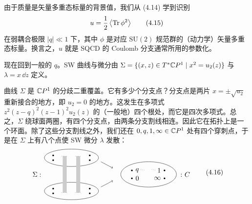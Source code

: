 
由于质量是矢量多重态标量的背景值，我们从 (4.14) 学到识别
\begin{equation}
  u=\frac12\left\langle\operatorname{Tr}\phi^2\right\rangle
  \tag{4.15}
\end{equation}
在弱耦合极限 $|q|\ll1$ 下，其中 $\phi$ 是对应 $\mathrm{SU}(2)$ 规范群的（动力学）矢量多重态标量。换言之，$u$ 就是 SQCD 的 Coulomb 分支通常所用的参数化。

 现在回到一般的 $q$。SW 曲线与微分由 $\Sigma=\{(x,z)\in T^*\mathbb{C} P^1\mid x^2=u_2(z)\}$ 与 $\lambda=x\,\dd z$ 定义。

曲线 $\Sigma$ 是 $\mathbb{C} P^1$ 的分歧二重覆盖。它有多少个分支点？分支点是两片 $x=\pm\sqrt{u_2}$ 重新接合的地方，即 $u_2=0$ 的地方。这发生在多项式 $z^2(z-q)^2(z-1)^2u_2(z)$ 的（一般地）四个根处，而它是四次多项式。总之，$\Sigma$ 绕球面两圈，有四个分支点，由两条分支割线相连。因此它在拓扑上是一个环面。除了这些分支割线之外，我们还在 $0,q,1,\infty\in\mathbb{C} P^1$ 处有四个穿刺点，于是在 $\Sigma$ 上有八个点使 SW 微分 $\lambda$ 发散：
\begin{equation}
\begin{tikzpicture}[scale=0.82,baseline=(current bounding box.center)]
  \draw (1.9,1.05) ellipse (1.7 and 0.55);
  \fill (0.75,1.2) circle (0.05);
  \fill (0.75,0.9) circle (0.05);
  \fill (3.05,1.2) circle (0.05);
  \fill (3.05,0.9) circle (0.05);
  \draw (1.9,-1.05) ellipse (1.7 and 0.55);
  \fill (0.75,-0.9) circle (0.05);
  \fill (0.75,-1.2) circle (0.05);
  \fill (3.05,-0.9) circle (0.05);
  \fill (3.05,-1.2) circle (0.05);
  \draw[fill=gray!40,draw=none] (1.35,-1.15) rectangle (1.6,1.15);
  \draw[fill=gray!40,draw=none] (2.2,-1.15) rectangle (2.45,1.15);
  \draw[dotted] (1.28,1.15)--(1.67,1.15);
  \draw[dotted] (1.28,-1.15)--(1.67,-1.15);
  \draw[dotted] (2.13,1.15)--(2.52,1.15);
  \draw[dotted] (2.13,-1.15)--(2.52,-1.15);
  \node[left] at (0.15,0) {$\Sigma:$};
  \draw[->] (3.75,0.8)--(4.5,0.4);
  \draw[->] (3.75,-0.8)--(4.5,-0.4);
  \draw (6.75,0) ellipse (1.75 and 0.8);
  \fill (5.7,0.25) circle (0.05);
  \node[right] at (5.78,0.25) {$q$};
  \fill (5.7,-0.25) circle (0.05);
  \node[right] at (5.78,-0.25) {$0$};
  \fill (7.75,0.25) circle (0.05);
  \node[left] at (7.67,0.25) {$1$};
  \fill (7.75,-0.25) circle (0.05);
  \node[left] at (7.67,-0.25) {$\infty$};
  \draw[dotted] (6.25,0.3)--(6.5,0.27);
  \draw[dotted] (6.95,0.3)--(7.2,0.27);
  \node[right] at (8.55,0) {$\colon C$};
\end{tikzpicture}
\tag{4.16}
\end{equation}

